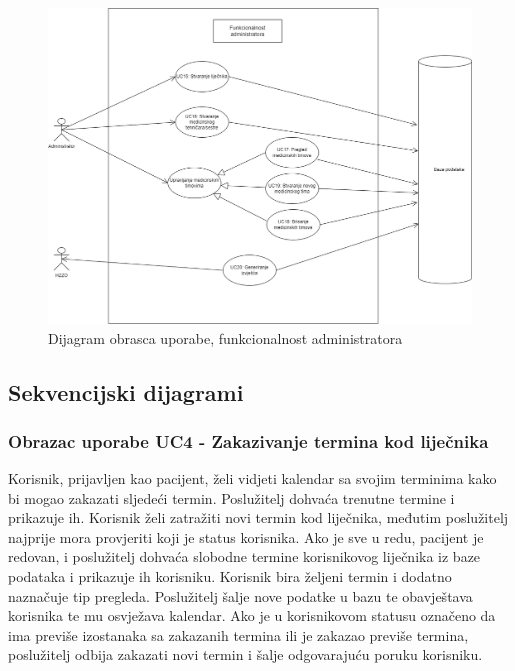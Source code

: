 				    \begin{figure}[H]
			            \includegraphics[width=\textwidth]{slike/administrator_usecase_v2.png} %
			            \caption{Dijagram obrasca uporabe, funkcionalnost administratora}
			            \label{fig:uc3} %
		            \end{figure}
		            
		            \eject
		            
			\subsection{Sekvencijski dijagrami}
				
				\subsubsection{Obrazac uporabe UC4 - Zakazivanje termina kod liječnika}
				Korisnik, prijavljen kao pacijent, želi vidjeti kalendar sa svojim terminima kako bi mogao zakazati sljedeći termin. Poslužitelj dohvaća trenutne termine i prikazuje ih. Korisnik želi zatražiti novi termin kod liječnika, međutim poslužitelj najprije mora provjeriti koji je status korisnika. Ako je sve u redu, pacijent je redovan, i poslužitelj dohvaća slobodne termine korisnikovog liječnika iz baze podataka i prikazuje ih korisniku. Korisnik bira željeni termin i dodatno naznačuje tip pregleda. Poslužitelj šalje nove podatke u bazu te obavještava korisnika te mu osvježava  kalendar. Ako je u korisnikovom statusu označeno da ima previše izostanaka sa zakazanih termina ili je zakazao previše termina, poslužitelj odbija zakazati novi termin i šalje odgovarajuću poruku korisniku.
				
